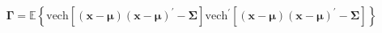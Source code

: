 \begin{equation}
    \boldsymbol{\Gamma}
    =
    \mathbb{E}
    \left\{
      \mathrm{vech}
      \left[
      \left(
      \mathbf{x}
      -
      \boldsymbol{\mu}
      \right)
      \left(
      \mathbf{x}
      -
      \boldsymbol{\mu}
      \right)^{\prime}
      -
      \boldsymbol{\Sigma}
      \right]
      \mathrm{vech}^{\prime}
      \left[
      \left(
      \mathbf{x}
      -
      \boldsymbol{\mu}
      \right)
      \left(
      \mathbf{x}
      -
      \boldsymbol{\mu}
      \right)^{\prime}
      -
      \boldsymbol{\Sigma}
      \right]
      \right\}
    \label{eq:gammaMatrix-gammacap-gen}
\end{equation}
